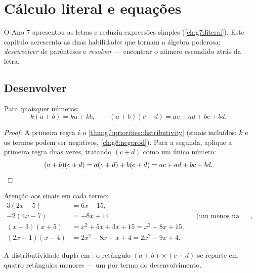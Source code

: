 \chapter{Cálculo literal e equações}\label{ch:g8:equations}

O Ano 7 apresentou as letras e reduziu expressões simples
(\cref{ch:g7:literal}). Este capítulo acrescenta as duas habilidades
que tornam a álgebra poderosa: \emph{desenvolver}  de
parênteses e \emph{resolver } --- encontrar o número escondido
atrás da letra.

\section{Desenvolver}

\begin{theorem}\label{thm:g8:equations:expand}
Para quaisquer números:
\[
k(a + b) = ka + kb,
\qquad
(a + b)(c + d) = ac + ad + bc + bd .
\]
\end{theorem}

\begin{proof}
A primeira regra é o \cref{thm:g7:priorities:distributivity} (sinais
incluídos: $k$ e os termos podem ser negativos, \cref{ch:g8:negprod}).
Para a segunda, aplique a primeira regra duas vezes, tratando
$(c + d)$ como um único número:
\[
(a + b)(c + d) = a(c + d) + b(c + d) = ac + ad + bc + bd .
\qedhere
\]
\end{proof}

\begin{example}\label{ex:g8:equations:expand}
Atenção aos sinais em cada termo:
\begin{align*}
3(2x - 5) &= 6x - 15, \\
-2(4x - 7) &= -8x + 14
&& \text{(um menos na frente troca os dois sinais)}, \\
(x + 3)(x + 5) &= x^2 + 5x + 3x + 15 = x^2 + 8x + 15, \\
(2x - 1)(x - 4) &= 2x^2 - 8x - x + 4 = 2x^2 - 9x + 4 .
\end{align*}
\end{example}

\begin{omfigure}

{\small A distributividade dupla em : o retângulo
$(a+b) \times (c+d)$ se reparte em quatro retângulos menores --- um por
termo do desenvolvimento.}
\end{omfigure}

